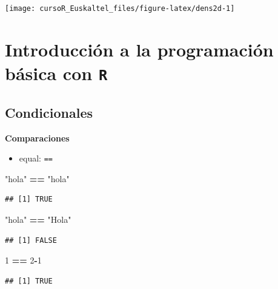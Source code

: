 \documentclass[]{book}
\newenvironment{Shaded}{\begin{snugshade}}{\end{snugshade}}
\newcommand{\DecValTok}[1]{\textcolor[rgb]{0.00,0.00,0.81}{#1}}
\newcommand{\StringTok}[1]{\textcolor[rgb]{0.31,0.60,0.02}{#1}}
\newcommand{\OperatorTok}[1]{\textcolor[rgb]{0.81,0.36,0.00}{\textbf{#1}}}
\providecommand{\tightlist}{%
  \setlength{\itemsep}{0pt}\setlength{\parskip}{0pt}}
\begin{document}
\begin{center}\texttt{[image: cursoR\_Euskaltel\_files/figure-latex/dens2d-1]} \end{center}

\chapter{\texorpdfstring{Introducción a la programación básica con
\texttt{R}}{Introducción a la programación básica con R}}\label{introduccion-a-la-programacion-basica-con-r}

\section{Condicionales}\label{condicionales}

\textbf{Comparaciones}

\begin{itemize}
\tightlist
\item
  equal: \texttt{==}
\end{itemize}

\begin{Shaded}
\begin{Highlighting}[]
  \StringTok{"hola"} \OperatorTok{==}\StringTok{ "hola"}
\end{Highlighting}
\end{Shaded}

\begin{verbatim}
## [1] TRUE
\end{verbatim}

\begin{Shaded}
\begin{Highlighting}[]
  \StringTok{"hola"} \OperatorTok{==}\StringTok{ "Hola"}
\end{Highlighting}
\end{Shaded}

\begin{verbatim}
## [1] FALSE
\end{verbatim}

\begin{Shaded}
\begin{Highlighting}[]
   \DecValTok{1} \OperatorTok{==}\StringTok{ }\DecValTok{2}\OperatorTok{-}\DecValTok{1}
\end{Highlighting}
\end{Shaded}

\begin{verbatim}
## [1] TRUE
\end{verbatim}
\end{document}
